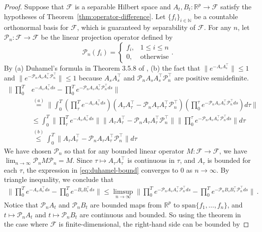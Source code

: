\documentclass[11pt]{article} %
\newcommand{\R}{\mathbb{R}}
\newcommand{\N}{\mathbb{N}}
\newcommand{\<}{\langle}
\renewcommand{\>}{\rangle}
\def\cP{{\mathcal P}}
\def\cF{{\mathcal F}}
\def\cP{{\mathcal P}}
\def\cF{{\mathcal F}}
\theoremstyle{plain}
\theoremstyle{definition}
\theoremstyle{remark}
\begin{document}
\begin{proof}
Suppose that $\cF$ is a separable Hilbert space and $A_t, B_t : \R^p \to \cF$ satisfy the hypotheses of Theorem~\ref{thm:operator-difference}.
Let $\{f_i\}_{i \in \N}$ be a countable orthonormal basis for $\cF$, which is guaranteed by separability of $\cF$. For any $n$, let $\cP_n : \cF \to \cF$ be the linear projection operator defined by $$\cP_n(f_i) = \begin{cases} f_i, & 1 \leq i \leq n \\ 0, & \mbox{otherwise} \end{cases}.$$
By (a) Duhamel's formula in Theorem 3.5.8 of \cite{dollard_friedman_1984}, (b) the fact that $\|e^{-A_sA_s^{\top}}\| \leq 1$ and $\|e^{-\cP_nA_sA_s^{\top}\cP_n^{\top}}\| \leq 1$ because $A_sA_s^{\top}$ and $\cP_nA_sA_s^{\top}\cP_n^{\top}$ are positive semidefinite.
\begin{align}
\|\prod_{0}^T& e^{-A_s A_s^{\top} ds} - \prod_{0}^T e^{-\cP_nA_sA_s^{\top}\cP_n^{\top} ds}\| \nonumber \\
&\stackrel{(a)}{=} \|\int_{0}^T \left(\prod_{\tau}^T e^{-A_s A_s^{\top} ds}\right) (A_{\tau} A_{\tau}^{\top} - \cP_nA_{\tau}A_{\tau}^{\top}\cP_n^{\top}) \left(\prod_{0}^{\tau} e^{-\cP_nA_sA_s^{\top}\cP_n^{\top} ds}\right) d\tau\| \nonumber \\
&\leq \int_{0}^T \|\prod_{\tau}^T e^{-A_s A_s^{\top} ds}\| \|A_{\tau} A_{\tau}^{\top} - \cP_nA_{\tau}A_{\tau}^{\top}\cP_n^{\top}\| \|\prod_{0}^{\tau} e^{-\cP_nA_sA_s^{\top}\cP_n^{\top} ds}\| d\tau \nonumber \\
&\stackrel{(b)}{\leq} \int_{0}^T \|A_{\tau} A_{\tau}^{\top} - \cP_nA_{\tau}A_{\tau}^{\top}\cP_n^{\top}\| d\tau \label{eq:duhamel-bound}
\end{align}
We have chosen $\cP_n$ so that for any bounded linear operator $M : \cF \to \cF$, we have $\lim_{n \to \infty} \cP_n M \cP_n = M$. Since $\tau \mapsto A_{\tau} A_{\tau}^{\top}$ is continuous in $\tau$, and $A_{\tau}$ is bounded for each $\tau$, the expression in \eqref{eq:duhamel-bound} converges to 0 as $n \to\infty$. By triangle inequality, we conclude that
\begin{align*}
\|\prod_{0}^T e^{-A_s A_s^{\top} ds} - \prod_{0}^T e^{-B_s B_s^{\top} ds}\| \leq \limsup_{n \to\infty}\|\prod_{0}^T e^{-\cP_n A_s A_s^{\top} \cP_n^{\top} ds} - \prod_{0}^T e^{-\cP_n B_s B_s^{\top}\cP_n^{\top} ds}\|\,.
\end{align*}
Notice that $\cP_n A_t$ and $\cP_n B_t$ are bounded maps from $\R^p$ to $\mathrm{span}\{f_1,\ldots,f_n\}$, and $t \mapsto \cP_n A_t$ and $t \mapsto \cP_n B_t$ are continuous and bounded. So using the theorem in the case where $\cF$ is finite-dimensional, the right-hand side can be bounded by

\end{proof}
\end{document}
